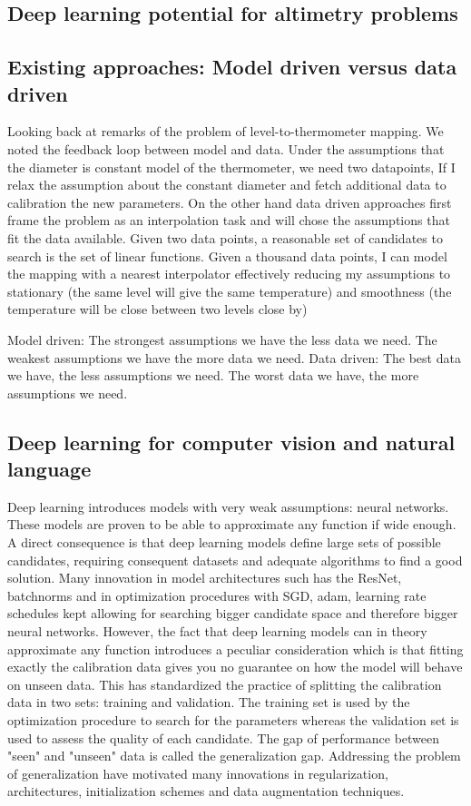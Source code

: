 \begin{bibunit}
\section{Deep learning potential for altimetry problems}
\subsection{Existing approaches: Model driven versus data driven}

Looking back at remarks of the problem of level-to-thermometer mapping. We noted the feedback loop between model and data.
Under the assumptions that the diameter is constant model of the thermometer, we need two datapoints, If I relax the assumption about the constant diameter and fetch additional data to calibration the new parameters.
On the other hand data driven approaches first frame the problem as an interpolation task and will chose the assumptions that fit the data available.
Given two data points, a reasonable set of candidates to search is the set of linear functions. Given a thousand data points, I can model the mapping with a nearest interpolator effectively reducing my assumptions to stationary (the same level will give the same temperature) and smoothness (the temperature will be close between two levels close by)

Model driven: The strongest assumptions we have the less data we need. The weakest assumptions we have the more data we need.
Data driven: The best data we have, the less assumptions we need. The worst data we have, the more assumptions we need.

\subsection{Deep learning for computer vision and natural language}

Deep learning introduces models with very weak assumptions: neural networks. These models are proven to be able to approximate any function if wide enough. 
A direct consequence is that deep learning models define large sets of possible candidates, requiring consequent datasets and adequate algorithms to find a good solution.
 Many innovation in model architectures such has the ResNet, batchnorms and in optimization procedures with SGD, adam, learning rate schedules kept allowing for searching bigger candidate space and therefore bigger neural networks.
However, the fact that deep learning models can in theory approximate any function introduces a peculiar consideration which is that fitting exactly the calibration data gives you no guarantee on how the model will behave on unseen data. This has standardized the practice of splitting the calibration data in two sets: training and validation. The training set is used  by the optimization procedure to search for the parameters whereas the validation set is used to assess the quality of each candidate. 
The gap of performance between "seen" and "unseen" data is called the generalization gap.
Addressing the problem of generalization have motivated many innovations in regularization, architectures, initialization schemes and data augmentation techniques.



\end{bibunit}

